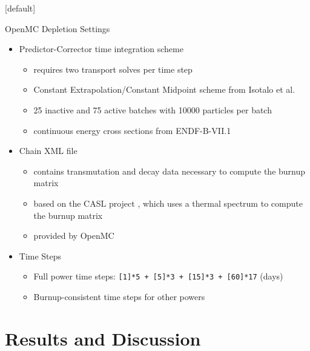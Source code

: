 \documentclass[9pt,t,aspectratio=169]{beamer}
\makeatletter
\newenvironment{withoutheadline}{
       \setbeamertemplate{headline}[default]
       \def\beamer@entrycode{\vspace*{-\headheight}}
    }{}
\makeatother
\begin{document}
\begin{withoutheadline}
\begin{frame}{OpenMC Depletion Settings}
    \pause
    \LARGE
    \begin{itemize}
        \item<2-> Predictor-Corrector time integration scheme
        \begin{itemize}
            \item<2-> requires two transport solves per time step
            \item<2-> Constant Extrapolation/Constant Midpoint scheme from Isotalo et al. \cite{isotalo_comparison_2015}
            \item<2-> 25 inactive and 75 active batches with 10000 particles per batch
            \item<2-> continuous energy cross sections from ENDF-B-VII.1
        \end{itemize}
        \item<3-> Chain XML file
        \begin{itemize}
            \item<3-> contains transmutation and decay data necessary to compute the burnup matrix
            \item<3-> based on the CASL project \cite{CASL-report}, which uses a thermal spectrum to compute the burnup matrix
            \item<3-> provided by OpenMC \cite{openmc-chains}
        \end{itemize}
        \item<4-> Time Steps
        \begin{itemize}
            \item<4-> Full power time steps: \texttt{[1]*5 + [5]*3 + [15]*3 + [60]*17} (days)
            \item<4-> Burnup-consistent time steps for other powers
        \end{itemize}
    \end{itemize}
    \normalsize
\end{frame}
\end{withoutheadline}
\section{Results and Discussion}
\end{document}
